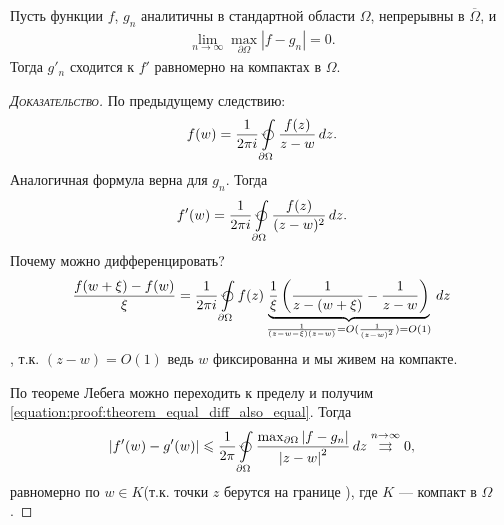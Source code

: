 \documentclass[../../main.tex]{subfiles}
\begin{document}
\begin{thm}
 Пусть функции $ f $, $ g_n $ аналитичны в стандартной области $ \Omega $, непрерывны в $ \overline \Omega $, и
 \begin{align*}
  \lim_{n \to \infty} \max_{\partial\Omega} \left| f-g_n \right| = 0.
 \end{align*} Тогда $ g'_n $ сходится к $ f' $ равномерно на компактах в $ \Omega $.
\end{thm}
\begin{proof}[\normalfont\textsc{Доказательство}]
 По предыдущему следствию:
 \begin{align*}
  f(w) = \frac{1}{2\pi i} \varointctrclockwise\limits_{\partial\Omega} \frac{f(z)}{z-w}\,dz.
 \end{align*} Аналогичная формула верна для $ g_n $. Тогда
 \begin{align}
  \label{equation:proof:theorem_equal_diff_also_equal}
	 f'(w) = \frac{1}{2\pi i} \varointctrclockwise\limits_{\partial\Omega} \frac{f(z)}{(z-w)^{2}}\,dz.
 \end{align} Почему можно дифференцировать?
 \begin{align*}
  \frac{f(w+\xi)-f(w)}{\xi} = \frac{1}{2\pi i} \varointctrclockwise\limits_{\partial \Omega} f(z) \underbrace{\frac{1}{\xi} \left( \frac{1}{z-(w+\xi)} - \frac{1}{z - w} \right)}_{\frac{1}{(z-w-\xi)(z-w)} = O(\frac{1}{(z-w)^{2}}) = O(1)}\,dz
 \end{align*}, т.к. $(z - w) = O(1)$ ведь $w$ фиксированна и мы живем на компакте.  

 По теореме Лебега можно переходить к пределу и получим \eqref{equation:proof:theorem_equal_diff_also_equal}. Тогда
 \begin{align*}
	 \left| f'(w) - g'(w) \right| \leqslant \frac{1}{2\pi} \varointctrclockwise\limits_{\partial\Omega} \frac{\max_{\partial\Omega} \left| f-g_n \right|}{\left| z-w \right|^{2}}\,dz \overset{n \to \infty}{\rightrightarrows} 0,
 \end{align*} равномерно по $ w \in K $(т.к. точки $z$ берутся на границе ), где $ K $ --- компакт в $ \Omega $.
\end{proof}
\end{document}
